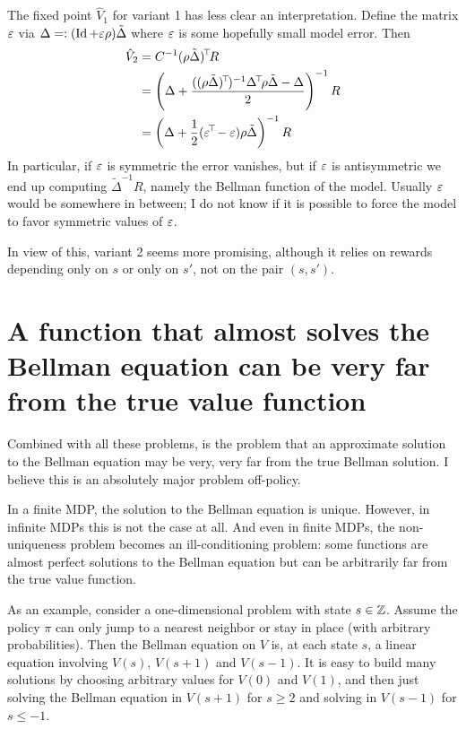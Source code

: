 \documentclass[11pt,a4paper]{article}
\begin{document}
The fixed point $\hat V_1$ for variant 1 has less clear an
interpretation. Define the matrix $\varepsilon$ via $\Delta =\mathrel{\mathop{:}}(\operatorname{Id}+\varepsilon\rho)\tilde \Delta$ where
$\varepsilon$ is some hopefully small model error. Then
\begin{align}
\hat V_2&=C^{-1}\transp{(\rho\tilde \Delta)}R
\\&=\left(
\Delta+\frac{(\transp{(\rho\tilde \Delta)})^{-1}\transp{\Delta} \rho \tilde
\Delta-\Delta}{2}
\right)^{-1}R
\\&=\left(
\Delta+\frac12(\transp{\eps}-\eps)\rho\tilde \Delta
\right)^{-1}R
\end{align}
In particular, if $\varepsilon$ is symmetric the error vanishes, but if $\varepsilon$
is antisymmetric we end up computing $\tilde \Delta^{-1}R$, namely the
Bellman function of the model. Usually $\varepsilon$ would be somewhere in
between; I do not know if it is possible to force the model to favor
symmetric values of $\varepsilon$.

In view of this, variant 2 seems more promising, although it relies on
rewards depending only on $s$ or only on $s'$, not on the pair $(s,s')$.

\section{A function that almost solves the Bellman equation can be very
far from the true value function}
\label{sec:quasibellman}

Combined with all these problems, is the problem that an approximate
solution to the Bellman equation may be very, very far from the true
Bellman solution.  I believe this is an absolutely major problem off-policy.

In a finite MDP, the solution to the Bellman equation is unique. However,
in infinite MDPs this is not the case at all. And even in finite MDPs,
the non-uniqueness problem becomes an ill-conditioning problem: some
functions are almost perfect solutions to the Bellman equation but can be
arbitrarily far from the true value function.

As an example, consider a one-dimensional problem with state $s\in {\mathbb{Z}}$.
Assume the policy $\pi$ can only jump to a nearest neighbor or stay in
place (with arbitrary probabilities). Then the Bellman equation on $V$
is, at each state $s$, a linear equation involving $V(s)$, $V(s+1)$ and
$V(s-1)$. It is easy to build many solutions by choosing arbitrary
values for $V(0)$ and $V(1)$, and then just solving the Bellman equation
in $V(s+1)$ for $s\geq 2$ and solving in $V(s-1)$ for $s\leq -1$.
\end{document}
